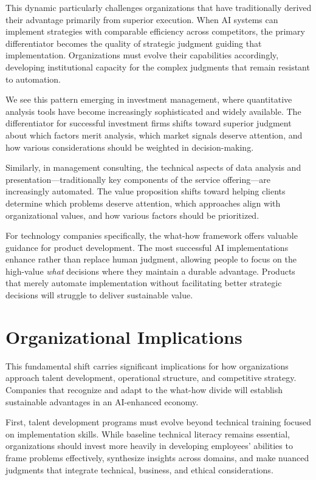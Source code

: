 \documentclass[
  Letterpaper,
]{scrbook}
\begin{document}
This dynamic particularly challenges organizations that have
traditionally derived their advantage primarily from superior execution.
When AI systems can implement strategies with comparable efficiency
across competitors, the primary differentiator becomes the quality of
strategic judgment guiding that implementation. Organizations must
evolve their capabilities accordingly, developing institutional capacity
for the complex judgments that remain resistant to automation.

We see this pattern emerging in investment
management, where quantitative analysis
tools have become increasingly sophisticated and widely available. The
differentiator for successful investment firms shifts toward superior
judgment about which factors merit analysis, which market signals
deserve attention, and how various considerations should be weighted in
decision-making.

Similarly, in management consulting, the technical aspects of data
analysis and presentation---traditionally key components of the service
offering---are increasingly automated. The value proposition shifts
toward helping clients determine which problems deserve attention, which
approaches align with organizational values, and how various factors
should be prioritized.

For technology companies specifically, the what-how framework offers
valuable guidance for product development. The most successful AI
implementations enhance rather than replace human judgment, allowing
people to focus on the high-value \emph{what} decisions where they
maintain a durable advantage. Products that merely automate
implementation without facilitating better strategic decisions will
struggle to deliver sustainable value.

\section{Organizational Implications}\label{organizational-implications}

This fundamental shift carries significant implications for how
organizations approach talent development, operational structure, and
competitive strategy. Companies that recognize and adapt to the what-how
divide will establish sustainable advantages in an AI-enhanced economy.

First, talent development programs must evolve beyond technical training
focused on implementation skills. While baseline technical literacy
remains essential, organizations should invest more heavily in
developing employees' abilities to frame problems effectively,
synthesize insights across domains, and make nuanced judgments that
integrate technical, business, and ethical considerations.
\end{document}
